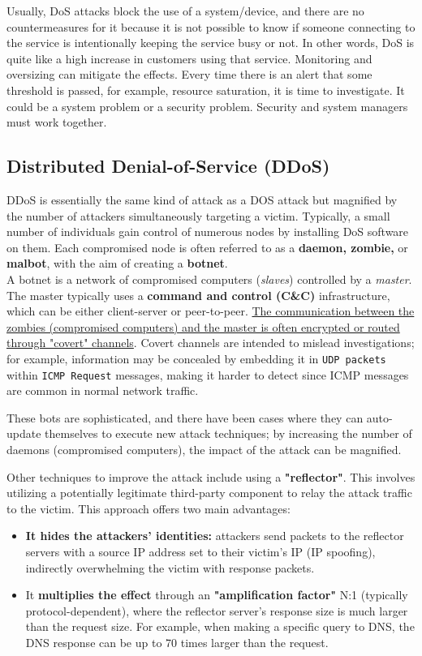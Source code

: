 Usually, DoS attacks block the use of a system/device, and there are no countermeasures for it because it is not possible to know if someone connecting to the service is intentionally keeping the service busy or not. In other words, DoS is quite like a high increase in customers using that service. Monitoring and oversizing can mitigate the effects. Every time there is an alert that some threshold is passed, for example, resource saturation, it is time to investigate. It could be a system problem or a security problem. Security and system managers must work together.



\subsection{Distributed Denial-of-Service (DDoS)}

DDoS is essentially the same kind of attack as a DOS attack but magnified by the number of attackers simultaneously targeting a victim.
Typically, a small number of individuals gain control of numerous nodes by installing DoS software on them. Each compromised node is often referred to as a \textbf{daemon, zombie,} or \textbf{malbot}, with the aim of creating a \textbf{botnet}.\\
A botnet is a network of compromised computers (\emph{slaves}) controlled by a \emph{master}. The master typically uses a \textbf{command and control (C\&C)} infrastructure, which can be either client-server or peer-to-peer.
\ul{The communication between the zombies (compromised computers) and the master is often encrypted or routed through "covert" channels}. Covert channels are intended to mislead investigations; for example, information may be concealed by embedding it in \texttt{UDP packets} within \texttt{ICMP Request} messages, making it harder to detect since ICMP messages are common in normal network traffic.

These bots are sophisticated, and there have been cases where they can auto-update themselves to execute new attack techniques; by increasing the number of daemons (compromised computers), the impact of the attack can be magnified.

Other techniques to improve the attack include using a \textbf{"reflector"}. This involves utilizing a potentially legitimate third-party component to relay the attack traffic to the victim. This approach offers two main advantages:
\begin{itemize}
	\item \textbf{It hides the attackers' identities:} attackers send packets to the reflector servers with a source IP address set to their victim's IP (IP spoofing), indirectly overwhelming the victim with response packets.
	\item It \textbf{multiplies the effect} through an \textbf{"amplification factor"} N:1 (typically protocol-dependent),
	      where the reflector server's response size is much larger than the request size.
	      For example, when making a specific query to DNS, the DNS response can be up to 70 times larger than the request.
\end{itemize}


